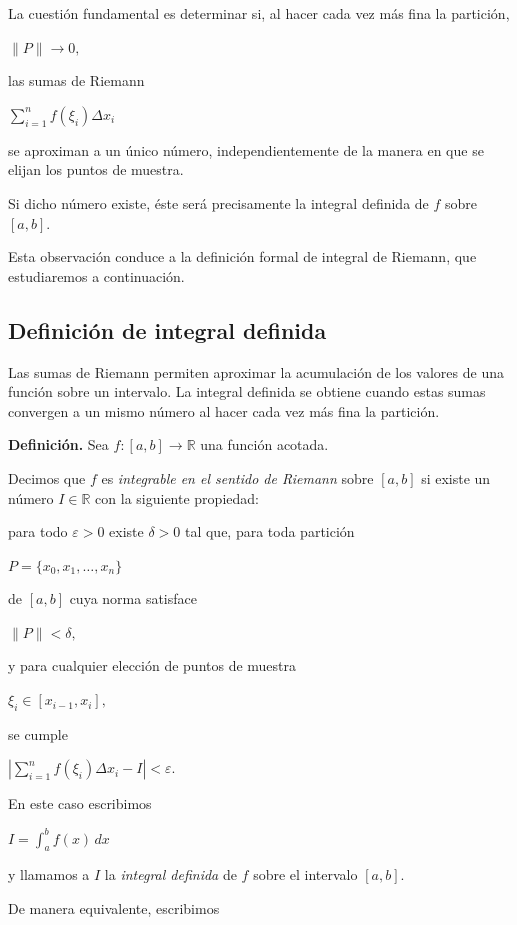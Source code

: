 \documentclass[12pt]{article}
\begin{document}
La cuestión fundamental es determinar si, al hacer cada vez más fina la
partición,

$
\|P\|\longrightarrow0,
$

las sumas de Riemann

$
\sum_{i=1}^{n}f(\xi_i)\Delta x_i
$

se aproximan a un único número, independientemente de la manera en que se
elijan los puntos de muestra.

Si dicho número existe, éste será precisamente la integral definida de
$f$ sobre $[a,b]$.

Esta observación conduce a la definición formal de integral de Riemann,
que estudiaremos a continuación.

\subsection*{Definición de integral definida}

Las sumas de Riemann permiten aproximar la acumulación de los valores de
una función sobre un intervalo. La integral definida se obtiene cuando
estas sumas convergen a un mismo número al hacer cada vez más fina la
partición.

\textbf{Definición.}
Sea
$
f:[a,b]\longrightarrow\mathbb{R}
$
una función acotada.

Decimos que $f$ es \emph{integrable en el sentido de Riemann} sobre
$[a,b]$ si existe un número $I\in\mathbb{R}$ con la siguiente propiedad:

para todo $\varepsilon>0$ existe $\delta>0$ tal que, para toda partición

$
P=\{x_0,x_1,\ldots,x_n\}
$

de $[a,b]$ cuya norma satisface

$
\|P\|<\delta,
$

y para cualquier elección de puntos de muestra

$
\xi_i\in[x_{i-1},x_i],
$

se cumple

$
\left|
\sum_{i=1}^{n}f(\xi_i)\Delta x_i-I
\right|
<\varepsilon.
$

En este caso escribimos

$
\boxed{
I=\int_a^b f(x)\,dx
}
$

y llamamos a $I$ la \emph{integral definida} de $f$ sobre el intervalo
$[a,b]$.

De manera equivalente, escribimos
\end{document}
